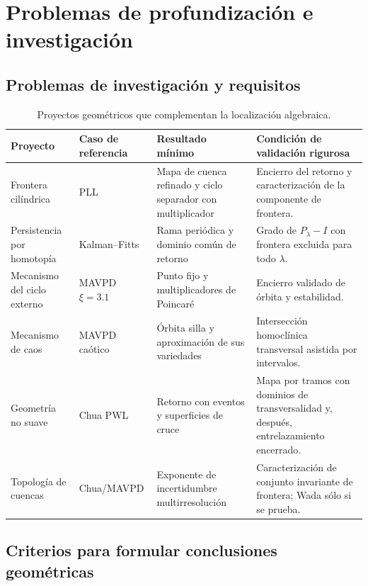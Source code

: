 \fi
\fi

\ifdefined\HAFONoGeoPosterior\else
\ifdefined\HAFOGeoBlockSelect\else
\section{Problemas de profundización e investigación}
\label{sec:geo-study-plan}

\HAFOCardFuture

\subsection{Problemas de investigación y requisitos}

\begin{table}[H]
\centering
\caption{Proyectos geométricos que complementan la localización algebraica.}
\label{geo:tab:projects}
\small
\begin{tabularx}{\textwidth}{@{}L{0.21\textwidth}L{0.20\textwidth}YY@{}}
\toprule
Proyecto & Caso de referencia & Resultado mínimo & Condición de validación rigurosa \\
\midrule
Frontera cilíndrica & PLL & Mapa de cuenca refinado y ciclo separador con
multiplicador & Encierro del retorno y caracterización de la componente de
frontera. \\
Persistencia por homotopía & Kalman--Fitts & Rama periódica y dominio común de
retorno & Grado de \(P_\lambda-I\) con frontera excluida para todo \(\lambda\).
\\
Mecanismo del ciclo externo & MAVPD \(\xi=3.1\) & Punto fijo y multiplicadores
de Poincaré & Encierro validado de órbita y estabilidad. \\
Mecanismo de caos & MAVPD caótico & Órbita silla y aproximación de sus
variedades & Intersección homoclínica transversal asistida por intervalos. \\
Geometría no suave & Chua PWL & Retorno con eventos y superficies de cruce &
Mapa por tramos con dominios de transversalidad y, después, entrelazamiento
encerrado. \\
Topología de cuencas & Chua/MAVPD & Exponente de incertidumbre multirresolución
& Caracterización de conjunto invariante de frontera; Wada sólo si se prueba.
\\
\bottomrule
\end{tabularx}
\end{table}

\subsection{Criterios para formular conclusiones geométricas}

